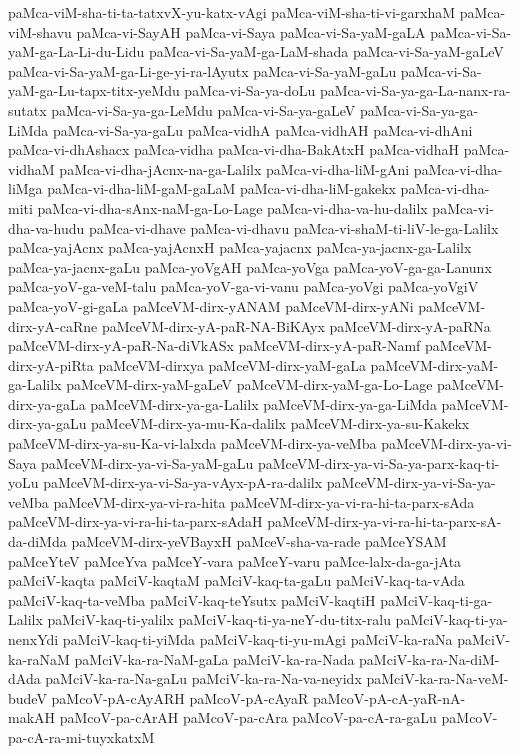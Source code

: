 {paMca-viM-sha-ti-ta-tatxvX-yu-katx-vAgi
paMca-viM-sha-ti-vi-garxhaM
paMca-viM-shavu
paMca-vi-SayAH
paMca-vi-Saya
paMca-vi-Sa-yaM-gaLA
paMca-vi-Sa-yaM-ga-La-Li-du-Lidu
paMca-vi-Sa-yaM-ga-LaM-shada
paMca-vi-Sa-yaM-gaLeV
paMca-vi-Sa-yaM-ga-Li-ge-yi-ra-lAyutx
paMca-vi-Sa-yaM-gaLu
paMca-vi-Sa-yaM-ga-Lu-tapx-titx-yeMdu
paMca-vi-Sa-ya-doLu
paMca-vi-Sa-ya-ga-La-nanx-ra-sutatx
paMca-vi-Sa-ya-ga-LeMdu
paMca-vi-Sa-ya-gaLeV
paMca-vi-Sa-ya-ga-LiMda
paMca-vi-Sa-ya-gaLu
paMca-vidhA
paMca-vidhAH
paMca-vi-dhAni
paMca-vi-dhAshacx
paMca-vidha
paMca-vi-dha-BakAtxH
paMca-vidhaH
paMca-vidhaM
paMca-vi-dha-jAcnx-na-ga-Lalilx
paMca-vi-dha-liM-gAni
paMca-vi-dha-liMga
paMca-vi-dha-liM-gaM-gaLaM
paMca-vi-dha-liM-gakekx
paMca-vi-dha-miti
paMca-vi-dha-sAnx-naM-ga-Lo-Lage
paMca-vi-dha-va-hu-dalilx
paMca-vi-dha-va-hudu
paMca-vi-dhave
paMca-vi-dhavu
paMca-vi-shaM-ti-liV-le-ga-Lalilx
paMca-yajAcnx
paMca-yajAcnxH
paMca-yajacnx
paMca-ya-jacnx-ga-Lalilx
paMca-ya-jacnx-gaLu
paMca-yoVgAH
paMca-yoVga
paMca-yoV-ga-ga-Lanunx
paMca-yoV-ga-veM-talu
paMca-yoV-ga-vi-vanu
paMca-yoVgi
paMca-yoVgiV
paMca-yoV-gi-gaLa
paMceVM-dirx-yANAM
paMceVM-dirx-yANi
paMceVM-dirx-yA-caRne
paMceVM-dirx-yA-paR-NA-BiKAyx
paMceVM-dirx-yA-paRNa
paMceVM-dirx-yA-paR-Na-diVkASx
paMceVM-dirx-yA-paR-Namf
paMceVM-dirx-yA-piRta
paMceVM-dirxya
paMceVM-dirx-yaM-gaLa
paMceVM-dirx-yaM-ga-Lalilx
paMceVM-dirx-yaM-gaLeV
paMceVM-dirx-yaM-ga-Lo-Lage
paMceVM-dirx-ya-gaLa
paMceVM-dirx-ya-ga-Lalilx
paMceVM-dirx-ya-ga-LiMda
paMceVM-dirx-ya-gaLu
paMceVM-dirx-ya-mu-Ka-dalilx
paMceVM-dirx-ya-su-Kakekx
paMceVM-dirx-ya-su-Ka-vi-lalxda
paMceVM-dirx-ya-veMba
paMceVM-dirx-ya-vi-Saya
paMceVM-dirx-ya-vi-Sa-yaM-gaLu
paMceVM-dirx-ya-vi-Sa-ya-parx-kaq-ti-yoLu
paMceVM-dirx-ya-vi-Sa-ya-vAyx-pA-ra-dalilx
paMceVM-dirx-ya-vi-Sa-ya-veMba
paMceVM-dirx-ya-vi-ra-hita
paMceVM-dirx-ya-vi-ra-hi-ta-parx-sAda
paMceVM-dirx-ya-vi-ra-hi-ta-parx-sAdaH
paMceVM-dirx-ya-vi-ra-hi-ta-parx-sA-da-diMda
paMceVM-dirx-yeVBayxH
paMceV-sha-va-rade
paMceYSAM
paMceYteV
paMceYva
paMceY-vara
paMceY-varu
paMce-lalx-da-ga-jAta
paMciV-kaqta
paMciV-kaqtaM
paMciV-kaq-ta-gaLu
paMciV-kaq-ta-vAda
paMciV-kaq-ta-veMba
paMciV-kaq-teYsutx
paMciV-kaqtiH
paMciV-kaq-ti-ga-Lalilx
paMciV-kaq-ti-yalilx
paMciV-kaq-ti-ya-neY-du-titx-ralu
paMciV-kaq-ti-ya-nenxYdi
paMciV-kaq-ti-yiMda
paMciV-kaq-ti-yu-mAgi
paMciV-ka-raNa
paMciV-ka-raNaM
paMciV-ka-ra-NaM-gaLa
paMciV-ka-ra-Nada
paMciV-ka-ra-Na-diM-dAda
paMciV-ka-ra-Na-gaLu
paMciV-ka-ra-Na-va-neyidx
paMciV-ka-ra-Na-veM-budeV
paMcoV-pA-cAyARH
paMcoV-pA-cAyaR
paMcoV-pA-cA-yaR-nA-makAH
paMcoV-pa-cArAH
paMcoV-pa-cAra
paMcoV-pa-cA-ra-gaLu
paMcoV-pa-cA-ra-mi-tuyxkatxM
}
